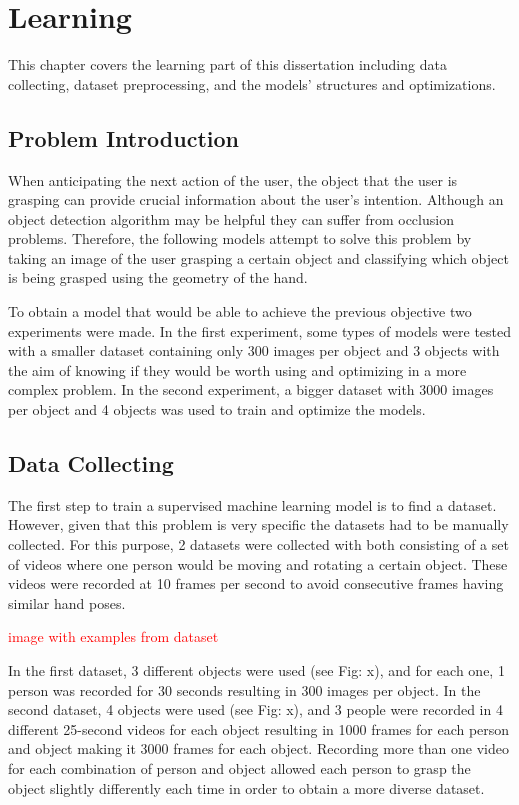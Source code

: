 \chapter{Learning}
\label{chapter:learning}

This chapter covers the learning part of this dissertation including data collecting, dataset preprocessing, and the models' structures and optimizations.

\section{Problem Introduction}

When anticipating the next action of the user, the object that the user is grasping can provide crucial information about the user's intention. Although an object detection algorithm may be helpful they can suffer from occlusion problems. Therefore, the following models attempt to solve this problem by taking an image of the user grasping a certain object and classifying which object is being grasped using the geometry of the hand.

To obtain a model that would be able to achieve the previous objective two experiments were made. In the first experiment, some types of models were tested with a smaller dataset containing only 300 images per object and 3 objects with the aim of knowing if they would be worth using and optimizing in a more complex problem. In the second experiment, a bigger dataset with 3000 images per object and 4 objects was used to train and optimize the models.

\section{Data Collecting}

The first step to train a supervised machine learning model is to find a dataset. However, given that this problem is very specific the datasets had to be manually collected. For this purpose, 2 datasets were collected with both consisting of a set of videos where one person would be moving and rotating a certain object. These videos were recorded at 10 frames per second to avoid consecutive frames having similar hand poses.

\textcolor{red}{image with examples from dataset}

In the first dataset, 3 different objects were used (see Fig: x), and for each one, 1 person was recorded for 30 seconds resulting in 300 images per object. In the second dataset, 4 objects were used (see Fig: x), and 3 people were recorded in 4 different 25-second videos for each object resulting in 1000 frames for each person and object making it 3000 frames for each object. Recording more than one video for each combination of person and object allowed each person to grasp the object slightly differently each time in order to obtain a more diverse dataset.

